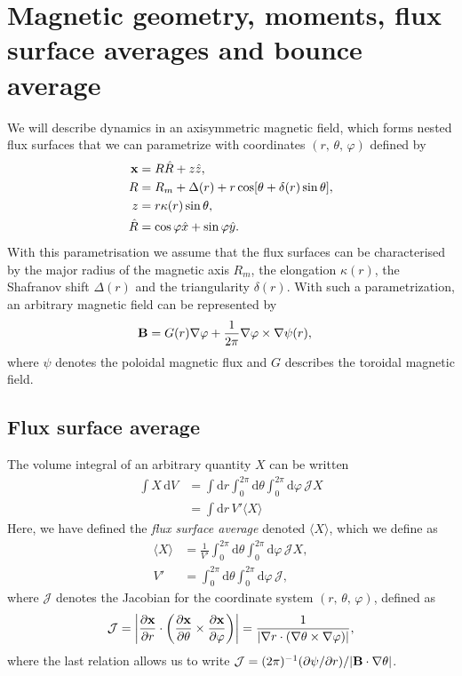\documentclass[11pt,a4paper]{article}
\newcommand{\rd}{\ensuremath{\mathrm{d}}}
\renewcommand{\b}[1]{\ensuremath{ {\bf #1 } }}
\begin{document}
\section{Magnetic geometry, moments, flux surface averages and bounce average}
We will describe dynamics in an axisymmetric magnetic field, which forms nested flux surfaces that we can parametrize with coordinates $(r,\,\theta,\,\varphi)$ defined by
\begin{align}
\b{x} &= R\hat{R} + z\hat{z}, \nonumber \\
R &= R_m + \Delta(r) + r\cos[\theta +\delta(r) \sin\theta], \nonumber \\
z &= r \kappa(r) \sin\theta, \nonumber \\
\hat{R} &= \cos\varphi \hat{x} + \sin\varphi \hat{y}.
\label{eq:geometry coordinates}
\end{align}
With this parametrisation we assume that the flux surfaces can be characterised by the major radius of the magnetic axis $R_m$, the elongation $\kappa(r)$, the Shafranov shift $\Delta(r)$ and the triangularity $\delta(r)$.
With such a parametrization, an arbitrary magnetic field can be represented by
\begin{align}
\b{B} &= G(r) \nabla \varphi + \frac{1}{2\pi}\nabla \varphi \times \nabla \psi(r),
\end{align}
where $\psi$ denotes the poloidal magnetic flux and $G$ describes the toroidal magnetic field.

\subsection{Flux surface average}
The volume integral of an arbitrary quantity $X$ can be written
\begin{align}
\int X \,\rd V &= \int\rd r  \int_0^{2\pi}\rd\theta \int_0^{2\pi}\rd \varphi \,\mathcal{J}X \nonumber \\
&= \int \rd r \, V'\langle X \rangle
\end{align}
Here, we have defined the \emph{flux surface average} denoted $\langle X \rangle$, which we define as
\begin{align}
\langle X \rangle &= \frac{1}{V'} \int_0^{2\pi}\rd \theta \int_0^{2\pi}\rd \varphi \, \mathcal{J}X, \nonumber \\
V' &= \int_0^{2\pi}\rd \theta \int_0^{2\pi}\rd \varphi  \, \mathcal{J},
\end{align}
where $\mathcal{J}$ denotes the Jacobian for the coordinate system $(r,\,\theta,\,\varphi)$, defined as
\begin{align}
\mathcal{J} =\left| \frac{\partial \b{x}}{\partial r}\cdot \left( \frac{\partial \b{x}}{\partial \theta}\times \frac{\partial\b{x}}{\partial \varphi}\right)\right| = \frac{1}{|\nabla r \cdot(\nabla \theta \times \nabla \varphi)|},
\end{align}
where the last relation allows us to write $\mathcal{J} = (2\pi)^{-1}(\partial \psi/\partial r) /|\b{B}\cdot\nabla \theta|$.
\end{document}

